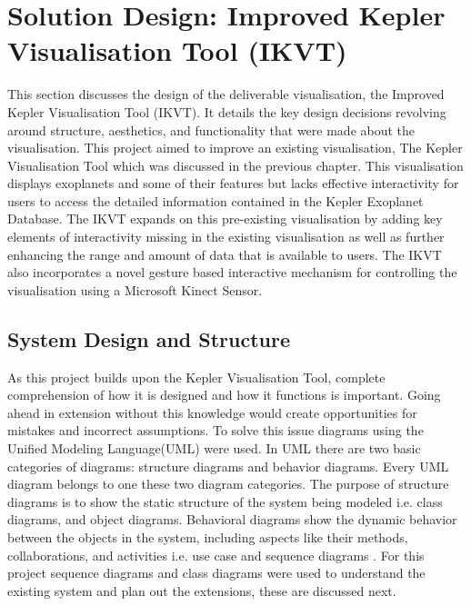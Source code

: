 \chapter{Solution Design: Improved Kepler Visualisation Tool (IKVT)}\label{C:sd}
This section discusses the design of the deliverable visualisation, the Improved
Kepler Visualisation Tool (IKVT). It details
the key design decisions revolving around structure, aesthetics, and
functionality that were made about the visualisation. 
This project aimed to improve an existing visualisation, The Kepler Visualisation
Tool which was discussed in the previous chapter. This 
visualisation displays exoplanets and some of their features but lacks effective
interactivity for users to access the detailed information contained in the
Kepler Exoplanet Database. The IKVT expands on this pre-existing
visualisation by adding key elements of interactivity missing in the existing
 visualisation as well as further enhancing the range and amount of data that
is available to users. The IKVT also incorporates a novel
gesture based interactive mechanism for controlling the visualisation using a
Microsoft
Kinect Sensor.

\section{System Design and Structure}
As this project builds upon the Kepler Visualisation
Tool, complete comprehension of
how it is designed and how it functions is important. Going ahead in extension
without this knowledge would create opportunities
for mistakes and incorrect assumptions. To solve this issue diagrams using the
Unified Modeling Language(UML) were used. In UML there are two basic categories
of diagrams: structure diagrams and
behavior diagrams. Every UML diagram belongs to one these two diagram
categories. The purpose of structure diagrams is to show the static structure of
the system being modeled i.e. class diagrams, and object diagrams. Behavioral
diagrams show the dynamic behavior between the objects in
the system, including aspects like their methods, collaborations, and activities
i.e. use case and sequence diagrams \cite{ibm}. For this project sequence
diagrams and class diagrams were used to
understand the existing system and plan out the extensions, these are discussed
next.

